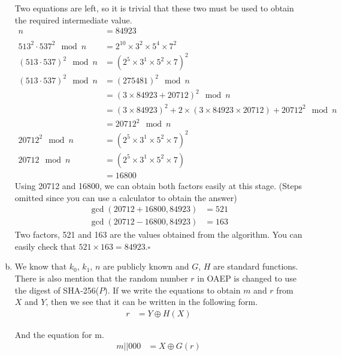 \documentclass[12pt]{article}
\begin{document}
\begin{enumerate}[(a)]
Two equations are left, so it is trivial that these two must be used to obtain the required intermediate value.
\begin{equation*}
\begin{split}
n&=84923\\\\
513^2\cdot 537^2\mod n&=2^{10}\times 3^2\times 5^4\times 7^2\\
(513\cdot 537)^2\mod n&=(2^{5}\times 3^1\times 5^2\times 7)^2\\
(513\cdot 537)^2\mod n&=(275481)^2\mod n\\
&=(3\times 84923+20712)^2\mod n\\
&=(3\times 84923)^2+2\times(3\times 84923\times 20712)+20712^2 \mod n\\
&=20712^2 \mod n\\
20712^2\mod n&=(2^{5}\times 3^1\times 5^2\times 7)^2\\
20712\mod n&=(2^{5}\times 3^1\times 5^2\times 7)\\
&=16800
\end{split}
\end{equation*}
Using 20712 and 16800, we can obtain both factors easily at this stage. (Steps omitted since you can use a calculator to obtain the answer)
\begin{equation*}
\begin{split}
\gcd(20712+16800,84923)&=521\\
\gcd(20712-16800,84923)&=163
\end{split}
\end{equation*}
Two factors, 521 and 163 are the values obtained from the algorithm. You can easily check that $521\times 163=84923$.\hfill $\square$
\item We know that $k_0$, $k_1$, $n$ are publicly known and $G$, $H$ are standard functions. There is also mention that the random number $r$ in OAEP is changed to use the digest of SHA-256($P$). If we write the equations to obtain $m$ and $r$ from $X$ and $Y$, then we see that it can be written in the following form.
\begin{equation} \label{eqn1}
\begin{split}
r&=Y\oplus H(X)
\end{split}
\end{equation}

And the equation for m.
\begin{equation} \label{eqn2}
\begin{split}
m||000&=X\oplus G(r)
\end{split}
\end{equation}


\end{enumerate}
\end{document}
